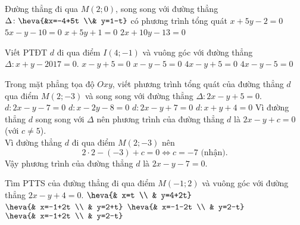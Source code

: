 	\begin{ex}%
		Đường thẳng đi qua $M(2;0)$, song song với đường thẳng $\Delta \colon \heva{&x=-4+5t \\& y=1-t}$ có phương trình tổng quát
		\choice
		{\True $x+5y-2=0$}
		{$5x-y-10=0$}
		{$x+5y+1=0$}
		{$2x+10y-13=0$}
	\end{ex}
	\begin{ex}%
		Viết PTĐT $d$ đi qua điểm $I(4;-1)$ và vuông góc với đường thẳng $\Delta \colon x+y-2017=0$.
		\choice
		{$x-y+5=0$}
		{\True $x-y-5=0$}
		{$4x-y+5=0$}
		{$4x-y-5=0$}
	\end{ex}
	\begin{ex}%
		Trong mặt phẳng tọa độ $Oxy$, viết phương trình tổng quát của đường thẳng $d$ qua điểm $M(2;-3)$ và song song với đường thẳng $\Delta \colon 2x-y+5=0$.
		\choice
		{\True $d \colon 2x-y-7=0$}
		{$d \colon x-2y-8=0$}
		{$d \colon 2x-y+7=0$}
		{$d \colon x+y+4=0$}
		\loigiai
		{
			Vì đường thẳng $d$ song song với $\Delta$ nên phương trình của đường thẳng $d$ là $2x-y+c=0$ (với $c\neq 5$).\\
			Vì đường thẳng $d$ đi qua điểm $M(2;-3)$ nên
			\[2\cdot 2-(-3)+c=0 \Leftrightarrow c=-7 \text{ (nhận)}.\]
			Vậy phương trình của đường thẳng $d$ là $2x-y-7=0$.
		}
	\end{ex}
	\begin{ex}%
		Tìm PTTS của đường thẳng đi qua điểm $M(-1;2)$ và vuông góc với đường thẳng $2x-y+4=0$.
		\choice
		{$\heva{& x=t \\ & y=4+2t} $}
		{$ \heva{& x=-1+2t \\ & y=2+t}$}
		{$\heva{& x=-1-2t \\ & y=2-t} $}
		{\True $\heva{& x=-1+2t \\ & y=2-t}$}
	\end{ex}
